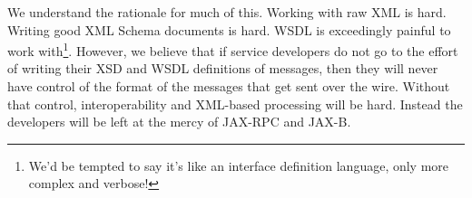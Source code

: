 We understand the rationale for much of this. Working with raw XML is
hard.  Writing good XML Schema documents is hard. WSDL is exceedingly
painful to work with\footnote{We'd be tempted to say it's like an
interface definition language, only more complex and
verbose!}. However, we believe that if service developers do not go to
the effort of writing their XSD and WSDL definitions of messages, then
they will never have control of the format of the messages that get
sent over the wire. Without that control, interoperability and
XML-based processing will be hard. Instead the developers will be left
at the mercy of JAX-RPC and JAX-B.

%


